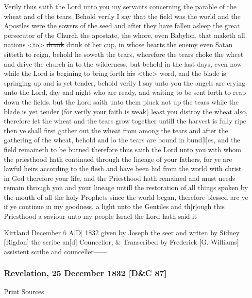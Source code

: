 				Verily thus saith the Lord unto you my servants concerning the parable of the wheat and of the tears, Behold verily I say that the field was the world and the Apostles were the sowers of the seed and after they have fallen asleep the great persecutor of the Church the apostate, the whore, even Babylon, that maketh all nations <to> \sout{drunk} drink of her cup, in whose hearts the enemy even Satan sitteth to reign, behold he soweth the tears, wherefore the tears choke the wheet and drive the church in to the wilderness, but behold in the last days, even now while the Lord is begining to bring forth \sout{his} <the> word, and the blade is springing up and is yet tender, behold verily I say unto you the angels are crying unto the Lord, day and night who are ready, and waiting to be sent forth to reap down the fields. but the Lord saith unto them pluck not up the tears while the blade is yet tender (for verily your faith is weak) least you distroy the wheat also, therefore let the wheat and the tears grow together untill the harvest is fully ripe then ye shall first gather out the wheat from among the tears and after the gathering of the wheat, behold and lo the tears are bound in bund[l]es, and the field remaineth to be burned therefore thus saith the Lord unto you with whom the priesthood hath continued through the lineage of your fathers, for ye are lawful heirs according to the flesh and have been hid from the world with christ in God therefore your life, and the Priesthood hath remained and must needs remain through you and your lineage untill the restoration of all things spoken by the mouth of all the holy Prophets since the world began, therefore blessed are ye if ye continue in my goodness, a light unto the Gentiles and th[r]ough this Priesthood a saviour unto my people Israel the Lord hath said it
				
				Kirtland December 6 A[D] 1832 given by Joseph the seer and writen by Sidney [Rigdon] the scribe an[d] Councellor, \& Transcribed by Frederick [G. Williams] assistent scribe and counceller------
				
		\subsubsection{Revelation, 25 December 1832 [D\&C 87]}
			\label{EMS-1832-JS-25-DEC-1832}
		
			\begin{description}
				\item[Print Sources]
			\end{description}

